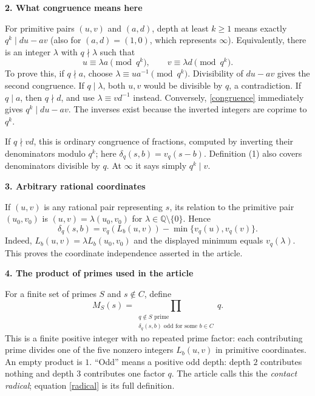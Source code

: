 \documentclass[11pt]{article}
\newcommand{\Q}{\mathbb Q}
\newcommand{\heading}[1]{\vspace{4pt}\textbf{#1}\par\vspace{-3pt}}
\begin{document}
\heading{2. What congruence means here}
For primitive pairs $(u,v)$ and $(a,d)$, depth at least $k\ge1$ means exactly $q^k\mid du-av$ (also for $(a,d)=(1,0)$, which represents $\infty$). Equivalently, there is an integer $\lambda$ with $q\nmid\lambda$ such that
\begin{equation}\label{congruence}
u\equiv\lambda a\pmod{q^k},\qquad v\equiv\lambda d\pmod{q^k}.
\end{equation}
To prove this, if $q\nmid a$, choose $\lambda\equiv ua^{-1}\pmod{q^k}$. Divisibility of $du-av$ gives the second congruence. If $q\mid\lambda$, both $u,v$ would be divisible by $q$, a contradiction. If $q\mid a$, then $q\nmid d$, and use $\lambda\equiv vd^{-1}$ instead. Conversely, \eqref{congruence} immediately gives $q^k\mid du-av$. The inverses exist because the inverted integers are coprime to $q^k$.

If $q\nmid vd$, this is ordinary congruence of fractions, computed by inverting their denominators modulo $q^k$; here $\delta_q(s,b)=v_q(s-b)$. Definition (1) also covers denominators divisible by $q$. At $\infty$ it says simply $q^k\mid v$.

\heading{3. Arbitrary rational coordinates}
If $(u,v)$ is any rational pair representing $s$, its relation to the primitive pair $(u_0,v_0)$ is $(u,v)=\lambda(u_0,v_0)$ for $\lambda\in\Q\setminus\{0\}$. Hence
\begin{equation}\label{normalized}
\delta_q(s,b)=v_q(L_b(u,v))-\min\{v_q(u),v_q(v)\}.
\end{equation}
Indeed, $L_b(u,v)=\lambda L_b(u_0,v_0)$ and the displayed minimum equals $v_q(\lambda)$. This proves the coordinate independence asserted in the article.

\newpage
\heading{4. The product of primes used in the article}
For a finite set of primes $S$ and $s\notin C$, define
\begin{equation}\label{radical}
M_S(s)=\prod_{\substack{q\notin S\text{ prime}\\
                     \delta_q(s,b)\text{ odd for some }b\in C}}q.
\end{equation}
This is a finite positive integer with no repeated prime factor: each contributing prime divides one of the five nonzero integers $L_b(u,v)$ in primitive coordinates. An empty product is $1$. ``Odd'' means a positive odd depth: depth $2$ contributes nothing and depth $3$ contributes one factor $q$. The article calls this the \emph{contact radical}; equation \eqref{radical} is its full definition.
\end{document}
